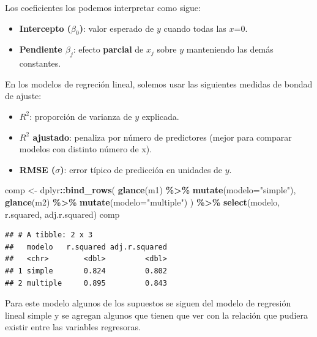 \documentclass[
]{book}
\newenvironment{Shaded}{\begin{snugshade}}{\end{snugshade}}
\newcommand{\AttributeTok}[1]{\textcolor[rgb]{0.13,0.29,0.53}{#1}}
\newcommand{\FunctionTok}[1]{\textcolor[rgb]{0.13,0.29,0.53}{\textbf{#1}}}
\newcommand{\NormalTok}[1]{#1}
\newcommand{\OtherTok}[1]{\textcolor[rgb]{0.56,0.35,0.01}{#1}}
\newcommand{\SpecialCharTok}[1]{\textcolor[rgb]{0.81,0.36,0.00}{\textbf{#1}}}
\newcommand{\StringTok}[1]{\textcolor[rgb]{0.31,0.60,0.02}{#1}}
\providecommand{\tightlist}{%
  \setlength{\itemsep}{0pt}\setlength{\parskip}{0pt}}
\begin{document}
Los coeficientes los podemos interpretar como sigue:

\begin{itemize}
\tightlist
\item
  \textbf{Intercepto (\(\beta_0\))}: valor esperado de \(y\) cuando todas las \(x\)=0.
\item
  \textbf{Pendiente \(\beta_j\)}: efecto \textbf{parcial} de \(x_j\) sobre \(y\) manteniendo las demás constantes.
\end{itemize}

En los modelos de regreción lineal, solemos usar las siguientes medidas de bondad de ajuste:

\begin{itemize}
\tightlist
\item
  \textbf{\(R^2\)}: proporción de varianza de \(y\) explicada.
\item
  \textbf{\(R^2\) ajustado}: penaliza por número de predictores (mejor para comparar modelos con distinto número de x).
\item
  \textbf{RMSE (\(\sigma\))}: error típico de predicción en unidades de \(y\).
\end{itemize}

\begin{Shaded}
\begin{Highlighting}[]
\NormalTok{comp }\OtherTok{\textless{}{-}}\NormalTok{ dplyr}\SpecialCharTok{::}\FunctionTok{bind\_rows}\NormalTok{(}
  \FunctionTok{glance}\NormalTok{(m1) }\SpecialCharTok{\%\textgreater{}\%} \FunctionTok{mutate}\NormalTok{(}\AttributeTok{modelo=}\StringTok{"simple"}\NormalTok{),}
  \FunctionTok{glance}\NormalTok{(m2) }\SpecialCharTok{\%\textgreater{}\%} \FunctionTok{mutate}\NormalTok{(}\AttributeTok{modelo=}\StringTok{"multiple"}\NormalTok{)}
\NormalTok{) }\SpecialCharTok{\%\textgreater{}\%} \FunctionTok{select}\NormalTok{(modelo, r.squared, adj.r.squared)}
\NormalTok{comp}
\end{Highlighting}
\end{Shaded}

\begin{verbatim}
## # A tibble: 2 x 3
##   modelo   r.squared adj.r.squared
##   <chr>        <dbl>         <dbl>
## 1 simple       0.824         0.802
## 2 multiple     0.895         0.843
\end{verbatim}

Para este modelo algunos de los supuestos se siguen del modelo de regresión lineal
simple y se agregan algunos que tienen que ver con la relación que pudiera existir entre
las variables regresoras.
\end{document}
